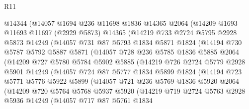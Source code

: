 \begin{lexlean}{R11}
\begin{coremodule}
        @14344
        (@14057
          @1694
          @236
          @11698
          @1836
          @14365
          @2064
          (@14209
            @1693
            @11693
            @11697
            (@2929 @5873)
            @14365
            (@14219
              @733
              @2724
              @5795
              @2928
              @5873
              @14249
              (@14057
                @731
                @87
                @5793
                @1834
                @5871
                @1824
                (@14194
                  @730
                  @5787
                  @5792
                  @5887
                  @5871
                  (@14057
                    @728
                    @236
                    @5785
                    @1836
                    @5885
                    @2064
                    (@14209
                      @727
                      @5780
                      @5784
                      @5902
                      @5885
                      (@14219
                        @726
                        @2724
                        @5779
                        @2928
                        @5901
                        @14249
                        (@14057
                          @724
                          @87
                          @5777
                          @1834
                          @5899
                          @1824
                          (@14194
                            @723
                            @5771
                            @5776
                            @5922
                            @5899
                            (@14057
                              @721
                              @236
                              @5769
                              @1836
                              @5920
                              @2064
                              (@14209
                                @720
                                @5764
                                @5768
                                @5937
                                @5920
                                (@14219
                                  @719
                                  @2724
                                  @5763
                                  @2928
                                  @5936
                                  @14249
                                  (@14057
                                    @717
                                    @87
                                    @5761
                                    @1834

\end{coremodule}
\end{lexlean}
